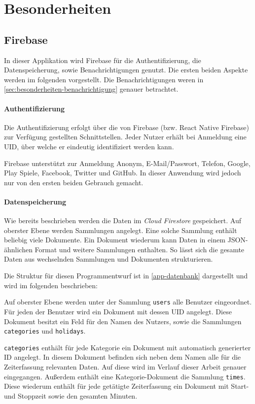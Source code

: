 \section{Besonderheiten}
\subsection{Firebase}
In dieser Applikation wird Firebase für die Authentifizierung,
die Datenspeicherung, sowie Benachrichtigungen genutzt.
Die ersten beiden Aspekte werden im folgenden vorgestellt.
Die Benachrichtigungen weren in \autoref{sec:besonderheiten-benachrichtigung} genauer betrachtet.

\paragraph{Authentifizierung}
Die Authentifizierung erfolgt über die von Firebase (bzw. React Native Firebase) zur Verfügung gestellten Schnittstellen.
Jeder Nutzer erhält bei Anmeldung eine UID, über welche er eindeutig identifiziert werden kann.

Firebase unterstützt zur Anmeldung Anonym, E-Mail/Passwort, Telefon, Google, Play Spiele, Facebook, Twitter und GitHub.
In dieser Anwendung wird jedoch nur von den ersten beiden Gebrauch gemacht.

\paragraph{Datenspeicherung}
Wie bereits beschrieben werden die Daten im \textit{Cloud Firestore} gespeichert.
Auf oberster Ebene werden Sammlungen angelegt.
Eine solche Sammlung enthält beliebig viele Dokumente.
Ein Dokument wiederum kann Daten in einem JSON-ähnlichen Format und weitere Sammlungen enthalten.
So lässt sich die gesamte Daten aus wechselnden Sammlungen und Dokumenten strukturieren.

Die Struktur für diesen Programmentwurf ist in \autoref{app-datenbank} dargestellt und wird im folgenden beschrieben:

Auf oberster Ebene werden unter der Sammlung \texttt{users} alle Benutzer eingeordnet.
Für jeden der Benutzer wird ein Dokument mit dessen UID angelegt.
Diese Dokument besitzt ein Feld für den Namen des Nutzers,
sowie die Sammlungen \texttt{categories} und \texttt{holidays}.

\texttt{categories} enthält für jede Kategorie ein Dokument mit automatisch generierter ID angelegt.
In diesem Dokument befinden sich neben dem Namen alle für die Zeiterfassung relevanten Daten.
Auf diese wird im Verlauf dieser Arbeit genauer eingegangen.
Außerdem enthält eine Kategorie-Dokument die Sammlung \texttt{times}.
Diese wiederum enthält für jede getätigte Zeiterfassung ein Dokument mit Start- und Stoppzeit sowie den gesamten Minuten.

